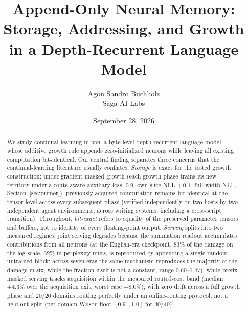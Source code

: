 \documentclass[11pt]{article}
\title{\bfseries Append-Only Neural Memory: Storage, Addressing, and Growth\\ \large in a Depth-Recurrent Language Model}
\author{Agon Sandro Buchholz\\\small Saga AI Labs}
\date{September 28, 2026}
\theoremstyle{definition}\newtheorem{definition}{Definition}
\theoremstyle{remark}\newtheorem{remark}{Remark}
\newcommand{\BDH}{\textsc{bdh}}
\begin{document}
\maketitle

\begin{abstract}
We study continual learning in \BDH{}, a byte-level depth-recurrent language
model~\cite{bdh} whose additive growth rule appends zero-initialized neurons while leaving all existing computation bit-identical. Our central finding separates three concerns that the continual-learning literature usually conflates.
\emph{Storage} is exact for the tested growth construction: under gradient-masked growth (each growth phase trains its new territory under a route-aware auxiliary loss, $0.9\cdot$own-slice-NLL $+\,0.1\cdot$full-width-NLL, Section~\ref{sec:primer}), previously acquired computation remains bit-identical at the tensor level across every subsequent phase (verified independently on two hosts by two independent agent environments, across writing systems, including a cross-script transition). Throughout, \emph{bit-exact} refers to equality of the preserved parameter tensors and buffers, not to identity of every floating-point output.
\emph{Serving} splits into two measured regimes: joint serving degrades because the summation readout accumulates contributions from all neurons (at the English-era checkpoint, 83\% of the damage on the log scale, 62\% in perplexity units, is reproduced by appending a single random, untrained block; across seven eras the same mechanism reproduces the majority of the damage in six, while the fraction itself is not a constant, range 0.60--1.47), while prefix-masked serving tracks acquisition within the measured routed-cost band (median $+4.3\%$ over the acquisition exit, worst case $+8.0\%$), with zero drift across a full growth phase and 20/20 domains routing perfectly under an online-routing protocol, not a held-out split (per-domain Wilson floor $[0.91,1.0]$ for 40/40).

\end{abstract}
\end{document}
